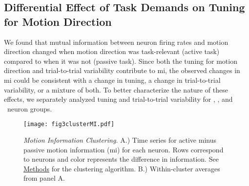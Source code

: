 \subsection*{Differential Effect of Task Demands on Tuning for Motion Direction}
We found that mutual information between neuron firing rates and motion direction changed when motion direction was task-relevant (active task) compared to when it was not (passive task). Since both the tuning for motion direction and trial-to-trial variability contribute to \gls{mi}, the observed changes in \gls{mi} could be consistent with a change in tuning, a change in trial-to-trial variability, or a mixture of both. To better characterize the nature of these effects, we separately analyzed tuning and trial-to-trial variability for \enhanced, \suppressed, and \consistent\ neuron groups.


	\begin{figure}
		\captionsetup{singlelinecheck = false, font=footnotesize, labelsep=space}
		\centering
		\texttt{[image: fig3clusterMI.pdf]}
		\caption{{\it Motion Information Clustering.} A.) Time series for active minus passive motion information (\gls{mi}) for each neuron. Rows correspond to neurons and color represents the difference in information. See \hyperref[{sec:methods}]{Methods} for the clustering algorithm. B.) Within-cluster averages from panel A.}
		\label{fig:MI}
	\end{figure}
	\addtocounter{page}{-1}
	\thispagestyle{empty}
	\clearpage


